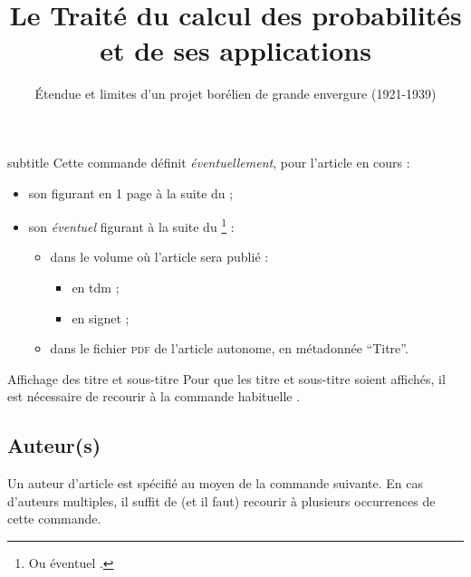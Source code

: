 \documentclass[french,nolocaltoc]{nwejmart}
\newtheorem[style=definition]{fait}
\newtheorem[title=contraventionnalisation]{ctrv}
\newtheorem[title-plural=anneaux]{anneau}
\newtheorem[title-plural=idéaux]{idéal}
\begin{document}
\begin{docCommand}{subtitle}{}
  Cette commande définit \emph{éventuellement}, pour l'article en cours :
  \begin{itemize}
  \item son  figurant en 1\iere{} page à la suite
    du  ;
  \item son \emph{éventuel}  figurant à la suite du
    \footnote{Ou éventuel .} :
    \begin{itemize}
    \item dans le volume où l'article sera publié :
      \begin{itemize}
      \item en \gls{tdm} ;
      \item en signet ;
      \end{itemize}
    \item dans le fichier \textsc{pdf} de l'article autonome, en métadonnée
      \enquote{Titre}.
    \end{itemize}
  \end{itemize}
\end{docCommand}

\begin{bodycode}[listing options={deletekeywords={[2]title}}]
\title[Le Traité du calcul des probabilités]{Le Traité du calcul des
  probabilités et de ses applications}
\subtitle[Étendue et limites d'un projet borélien]{Étendue et limites
  d'un projet borélien de grande envergure (1921-1939)}
\end{bodycode}

\begin{dbremark}{Affichage des titre et sous-titre}{}
  Pour que les titre et sous-titre soient affichés, il est nécessaire de
  recourir à la commande habituelle .
\end{dbremark}

\subsection{Auteur(s)}
\label{sec-auteurs}

Un auteur d'article est spécifié au moyen de la commande 
suivante. En cas d'auteurs multiples, il suffit de (et il faut) recourir
à plusieurs occurrences de cette commande.
\end{document}
